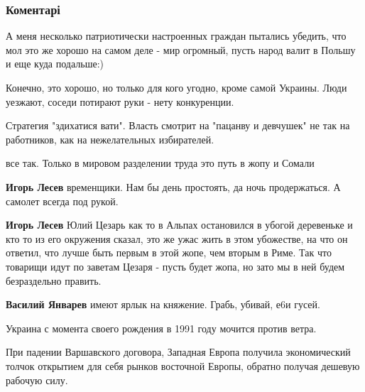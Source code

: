  
 
 
 
 
\subsubsection{Коментарі}

\begin{itemize} %

А меня несколько патриотически настроенных граждан пытались убедить, что мол
это же хорошо на самом деле - мир огромный, пусть народ валит в Польшу и еще
куда подальше:)

Конечно, это хорошо, но только для кого угодно, кроме самой Украины. Люди уезжают, соседи потирают руки - нету конкуренции.

Стратегия "здихатися вати". Власть смотрит на "пацанву и девчушек" не так на работников, как на нежелательных избирателей.

\begin{itemize} %
все так. Только в мировом разделении труда это путь в жопу и Сомали

\textbf{Игорь Лесев} временщики. Нам бы день простоять, да ночь продержаться. А самолет всегда под рукой.

\textbf{Игорь Лесев} Юлий Цезарь как то в Альпах остановился в убогой деревеньке и кто то из его окружения сказал, это же ужас жить в этом убожестве, на что он ответил, что лучше быть первым в этой жопе, чем вторым в Риме. Так что товарищи идут по заветам Цезаря - пусть будет жопа, но зато мы в ней будем безраздельно править.

\textbf{Василий Январев} имеют ярлык на княжение. Грабь, убивай, е6и гусей.
\end{itemize} %


Украина с момента своего рождения в 1991 году мочится против ветра.

При падении Варшавского договора, Западная Европа получила экономический толчок
открытием для себя рынков восточной Европы, обратно получая дешевую рабочую
силу.


\end{itemize}
